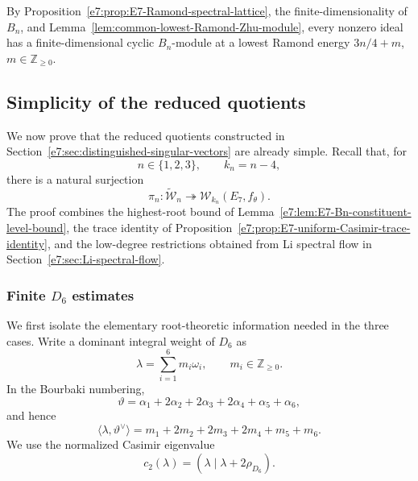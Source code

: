 \documentclass[11pt,reqno]{amsart}
\theoremstyle{definition}
\theoremstyle{remark}
\begin{document}
By Proposition~\ref{e7:prop:E7-Ramond-spectral-lattice}, the
finite-dimensionality of $B_n$, and
Lemma~\ref{lem:common-lowest-Ramond-Zhu-module}, every nonzero ideal has a
finite-dimensional cyclic $B_n$-module at a lowest Ramond energy
$3n/4+m$, $m\in\mathbb Z_{\ge0}$.

\subsection{Simplicity of the reduced quotients}
\label{e7:sec:simplicity-reduced-quotients}

We now prove that the reduced quotients constructed in
Section~\ref{e7:sec:distinguished-singular-vectors} are already simple.  Recall
that, for
\[
  n\in\{1,2,3\},
  \qquad
  k_n=n-4,
\]
there is a natural surjection
\begin{equation}
  \pi_n:\widetilde{\mathcal W}_n
  \twoheadrightarrow
  \mathcal W_{k_n}(E_7,f_\theta).
  \label{e7:eq:E7-section6-natural-surjection}
\end{equation}
The proof combines the highest-root bound of
Lemma~\ref{e7:lem:E7-Bn-constituent-level-bound}, the trace identity of
Proposition~\ref{e7:prop:E7-uniform-Casimir-trace-identity}, and the low-degree
restrictions obtained from Li spectral flow in
Section~\ref{e7:sec:Li-spectral-flow}.

\subsubsection{Finite \texorpdfstring{\(D_6\)}{D6} estimates}


We first isolate the elementary root-theoretic information needed in the
three cases.  Write a dominant integral weight of \(D_6\) as
\begin{equation*}
  \lambda=\sum_{i=1}^{6}m_i\omega_i,
  \qquad m_i\in\mathbb Z_{\ge0}.
\end{equation*}
In the Bourbaki numbering,
\begin{equation*}
  \vartheta
  =\alpha_1+2\alpha_2+2\alpha_3+2\alpha_4+\alpha_5+\alpha_6,
\end{equation*}
and hence
\begin{equation}
  \langle\lambda,\vartheta^\vee\rangle
  =m_1+2m_2+2m_3+2m_4+m_5+m_6.
  \label{e7:eq:E7-D6-highest-root-level-formula}
\end{equation}
We use the normalized Casimir eigenvalue
\begin{equation}
  c_2(\lambda)
  =(\lambda\mid\lambda+2\rho_{D_6}).
  \label{e7:eq:E7-D6-Casimir-eigenvalue-definition}
\end{equation}
\end{document}
